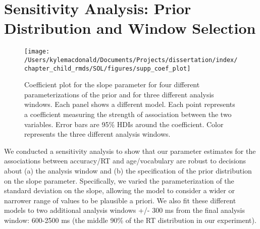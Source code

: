 \documentclass[oneside]{report}
\begin{document}
\section{Sensitivity Analysis: Prior Distribution and Window
Selection}\label{sensitivity-analysis-prior-distribution-and-window-selection}
\begin{figure}[t]

{\centering \texttt{[image: /Users/kylemacdonald/Documents/Projects/dissertation/index/chapter\_child\_rmds/SOL/figures/supp\_coef\_plot]} 

}

\caption[Results of sensitivity analysis for Experiment 1.1.]{Coefficient plot for the slope parameter for four different parameterizations of the prior and for three different analysis windows. Each panel shows a different model. Each point represents a coefficient measuring the strength of association between the two variables. Error bars are 95\% HDIs around the coefficient. Color represents the three different analysis windows.}\label{fig:unnamed-chunk-9}
\end{figure}
We conducted a sensitivity analysis to show that our parameter estimates
for the associations between accuracy/RT and age/vocabulary are robust
to decisions about (a) the analysis window and (b) the specification of
the prior distribution on the slope parameter. Specifically, we varied
the parameterization of the standard deviation on the slope, allowing
the model to consider a wider or narrower range of values to be
plausible a priori. We also fit these different models to two additional
analysis windows +/- 300 ms from the final analysis window: 600-2500 ms
(the middle 90\% of the RT distribution in our experiment).
\end{document}
